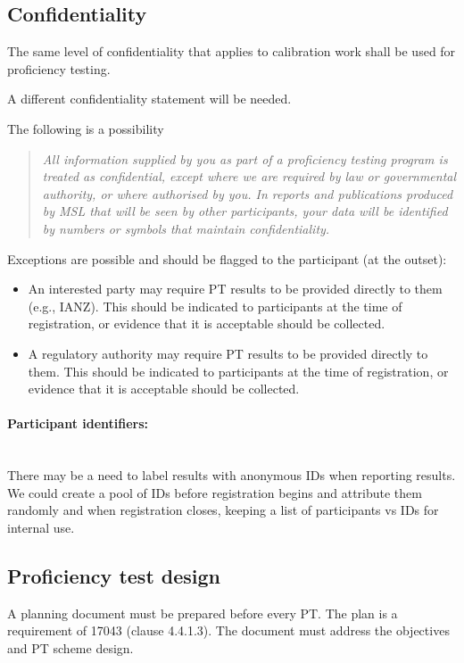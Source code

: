 \subsection{Confidentiality}
The same level of confidentiality that applies to calibration work shall be used for proficiency testing. 

A different confidentiality statement will be needed. 

The following is a possibility
\begin{quote}
\it
All information supplied by you as part of a proficiency testing program is treated as confidential, except where we are required by law or governmental authority, or where authorised by you. In reports and publications produced by MSL that will be seen by other participants, your data will be identified by numbers or symbols that maintain confidentiality.
\end{quote}

Exceptions are possible and should be flagged to the participant (at the outset):
\begin{itemize}
\item	An interested party may require PT results to be provided directly to them (e.g., IANZ). This should be indicated to participants at the time of registration, or evidence that it is acceptable should be collected.
\item	A regulatory authority may require PT results to be provided directly to them. This should be indicated to participants at the time of registration, or evidence that it is acceptable should be collected.

\end{itemize}


\paragraph{Participant identifiers:}\mbox{}\\
There may be a need to label results with anonymous IDs when reporting results. We could create a pool of IDs before registration begins and attribute them randomly and when registration closes, keeping a list of participants vs IDs for internal use.
 

\subsection{Proficiency test design}
\label{ss:PT_design}
A planning document must be prepared before every PT. The plan is a requirement of 17043 (clause 4.4.1.3).  The document must address the objectives and PT scheme design. 


